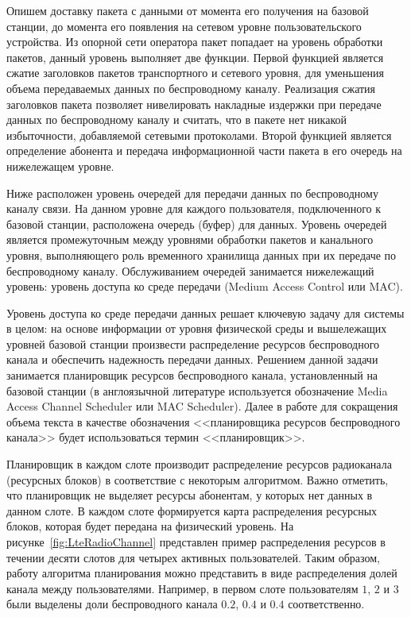 Опишем доставку пакета с данными от момента его получения на базовой станции, до момента его появления на сетевом уровне пользовательского устройства. Из опорной сети оператора пакет попадает на уровень обработки пакетов, данный уровень выполняет две функции. Первой функцией является сжатие заголовков пакетов транспортного и сетевого уровня, для уменьшения объема передаваемых данных по беспроводному каналу. Реализация сжатия заголовков пакета позволяет нивелировать накладные издержки при передаче данных по беспроводному каналу и считать, что в пакете нет никакой избыточности, добавляемой сетевыми протоколами. Второй функцией является определение абонента и передача информационной части пакета в его очередь на нижележащем уровне.

Ниже расположен уровень очередей для передачи данных по беспроводному каналу связи. На данном уровне для каждого пользователя, подключенного к базовой станции, расположена очередь (буфер) для данных. Уровень очередей является промежуточным между уровнями обработки пакетов и канального уровня, выполняющего роль временного хранилища данных при их передаче по беспроводному каналу. Обслуживанием очередей занимается нижележащий уровень: уровень доступа ко среде передачи (Medium Access Control или MAC).

Уровень доступа ко среде передачи данных решает ключевую задачу для системы в целом: на основе информации от уровня физической среды и вышележащих уровней базовой станции произвести распределение ресурсов беспроводного канала и обеспечить надежность передачи данных. Решением данной задачи занимается планировщик ресурсов беспроводного канала, установленный на базовой станции (в англоязычной литературе используется обозначение Media Access Channel Scheduler или MAC Scheduler). Далее в работе для сокращения объема текста в качестве обозначения <<планировщика ресурсов беспроводного канала>> будет использоваться термин <<планировщик>>.

Планировщик в каждом слоте производит распределение ресурсов радиоканала (ресурсных блоков) в соответствие с некоторым алгоритмом. Важно отметить, что планировщик не выделяет ресурсы абонентам, у которых нет данных в данном слоте. В каждом слоте формируется карта распределения ресурсных блоков, которая будет передана на физический уровень. На рисунке~\ref{fig:LteRadioChannel} представлен пример распределения ресурсов в течении десяти слотов для четырех активных пользователей. Таким образом, работу алгоритма планирования можно представить в виде распределения долей канала между пользователями. Например, в первом слоте пользователям $1$, $2$ и $3$ были выделены доли беспроводного канала $0.2$, $0.4$ и $0.4$ соответственно.

